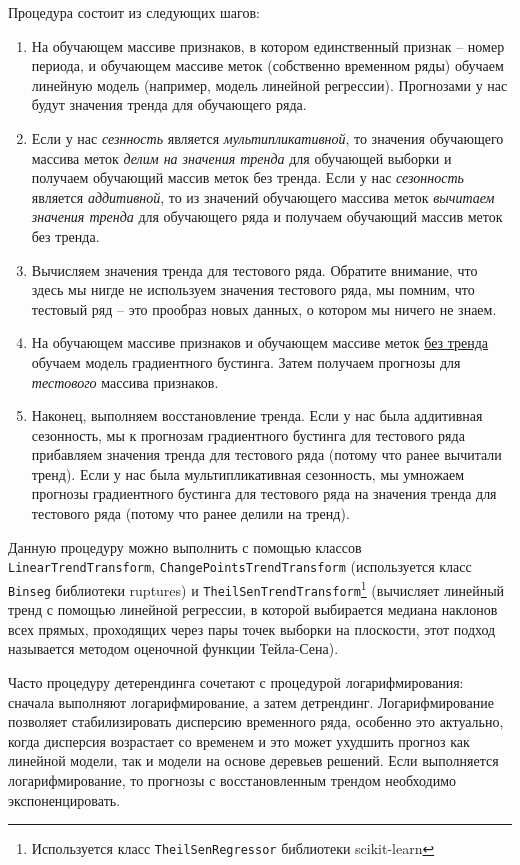 \documentclass[%
	11pt,
	a4paper,
	utf8,
		]{article}
\begin{document}
Процедура состоит из следующих шагов:
\begin{enumerate}
	\item На обучающем массиве признаков, в котором единственный признак -- номер периода, и обучающем массиве меток (собственно временном ряды) обучаем линейную модель (например, модель линейной регрессии). Прогнозами у нас будут значения тренда для обучающего ряда.
	
	\item Если у нас \emph{сезнность} является \emph{мультипликативной}, то значения обучающего массива меток \emph{делим на значения тренда} для обучающей выборки и получаем обучающий массив меток без тренда. Если у нас \emph{сезонность} является \emph{аддитивной}, то из значений обучающего массива меток \emph{вычитаем значения тренда} для обучающего ряда и получаем обучающий массив меток без тренда.
	
	\item Вычисляем значения тренда для тестового ряда. Обратите внимание, что здесь мы нигде не используем значения тестового ряда, мы помним, что тестовый ряд -- это прообраз новых данных, о котором мы ничего не знаем.
	
	\item На обучающем массиве признаков и обучающем массиве меток \underline{без тренда} обучаем модель градиентного бустинга. Затем получаем прогнозы для \emph{тестового} массива признаков.
	
	\item Наконец, выполняем восстановление тренда. Если у нас была аддитивная сезонность, мы к прогнозам градиентного бустинга для тестового ряда прибавляем значения тренда для тестового ряда (потому что ранее вычитали тренд). Если у нас была мультипликативная сезонность, мы умножаем прогнозы градиентного бустинга для тестового ряда на значения тренда для тестового ряда (потому что ранее делили на тренд).
\end{enumerate}

Данную процедуру можно выполнить с помощью классов \verb|LinearTrendTransform|, \verb|ChangePointsTrendTransform| (используется класс \verb|Binseg| библиотеки ruptures) и \verb|TheilSenTrendTransform|\footnote{Используется класс \texttt{TheilSenRegressor} библиотеки scikit-learn} (вычисляет линейный тренд с помощью линейной регрессии, в которой выбирается медиана наклонов всех прямых, проходящих через пары точек выборки на плоскости, этот подход называется методом оценочной функции Тейла-Сена).

Часто процедуру детерендинга сочетают с процедурой логарифмирования: сначала выполняют логарифмирование, а затем детрендинг. Логарифмирование позволяет стабилизировать дисперсию временного ряда, особенно это актуально, когда дисперсия возрастает со временем и это может ухудшить прогноз как линейной модели, так и модели на основе деревьев решений. Если выполняется логарифмирование, то прогнозы с восстановленным трендом необходимо экспоненцировать.
\end{document}
